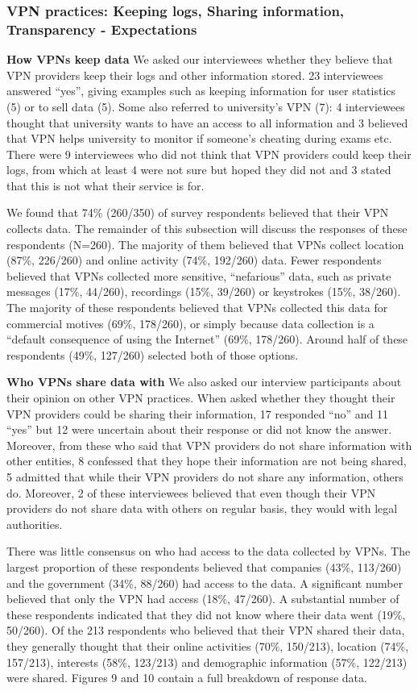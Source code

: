 \subsubsection{VPN practices: Keeping logs, Sharing information, Transparency
- Expectations} \textbf{How VPNs keep data} We asked our interviewees whether
they believe that VPN providers keep their logs and other information stored.
23 interviewees answered “yes”, giving examples such as keeping information
for user statistics (5) or to sell data (5). Some also referred to
university’s VPN (7): 4 interviewees thought that university wants to have an
access to all information and 3 believed that VPN helps university to monitor
if someone’s cheating during exams etc. There were 9 interviewees who did not
think that VPN providers could keep their logs, from which at least 4 were not
sure but hoped they did not and 3 stated that this is not what their service
is for.

We found that 74\% (260/350) of survey respondents believed that their VPN
collects data. The remainder of this subsection will discuss the responses of
these respondents (N=260). The majority of them believed that VPNs collect
location (87\%, 226/260) and online activity (74\%, 192/260) data. Fewer
respondents believed that VPNs collected more sensitive, “nefarious” data,
such as private messages (17\%, 44/260), recordings (15\%, 39/260) or
keystrokes (15\%, 38/260). The majority of these respondents believed that
VPNs collected this data for commercial motives (69\%, 178/260), or simply
because data collection is a “default consequence of using the Internet”
(69\%, 178/260). Around half of these respondents (49\%, 127/260) selected
both of those options.

\textbf{Who VPNs share data with} We also asked our interview participants
about their opinion on other VPN practices. When asked whether they thought
their VPN providers could be sharing their information, 17 responded “no” and
11 “yes” but 12 were uncertain about their response or did not know the
answer.  Moreover, from these who said that VPN providers do not share
information with other entities, 8 confessed that they hope their information
are not being shared, 5 admitted that while their VPN providers do not share
any information, others do. Moreover, 2 of these interviewees believed that
even though their VPN providers do not share data with others on regular
basis, they would with legal authorities. 

There was little consensus on who had access to the data collected by VPNs.
The largest proportion of these respondents believed that companies (43\%,
113/260) and the government (34\%, 88/260) had access to the data. A
significant number believed that only the VPN had access (18\%, 47/260). A
substantial number of these respondents indicated that they did not know where
their data went (19\%, 50/260). Of the 213 respondents who believed that their
VPN shared their data, they generally thought that their online activities
(70\%, 150/213), location (74\%, 157/213), interests (58\%, 123/213) and
demographic information (57\%, 122/213) were shared. Figures 9 and 10 contain
a full breakdown of response data.

